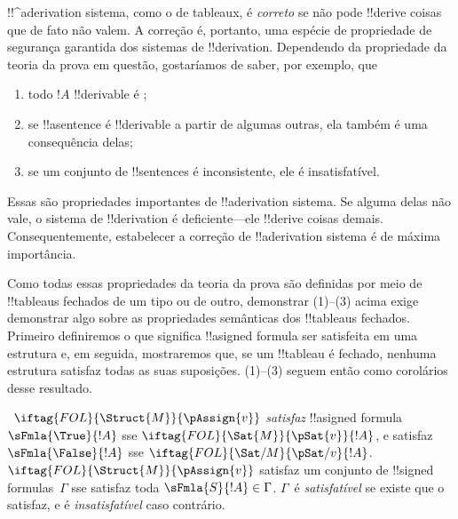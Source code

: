 \documentclass[../../../include/open-logic-section]{subfiles}
\begin{document}
      {}
      {}
      

\begin{explain}
!!^a{derivation} sistema, como o de tableaux, é \emph{correto}
se não pode !!{derive} coisas que de fato não valem. A correção é,
portanto, uma espécie de propriedade de segurança garantida dos sistemas de !!{derivation}.
Dependendo da propriedade da teoria da prova em questão, gostaríamos
de saber, por exemplo, que
\begin{enumerate}
\item todo $!A$ !!{derivable} é ;
\item se !!a{sentence} é !!{derivable} a partir de algumas outras, ela também é uma
  consequência delas;
\item se um conjunto de !!{sentence}s é inconsistente, ele é insatisfatível.
\end{enumerate}
Essas são propriedades importantes de !!a{derivation} sistema. Se alguma delas não
vale, o sistema de !!{derivation} é deficiente---ele !!{derive} coisas demais.
Consequentemente, estabelecer a correção de !!a{derivation} sistema é de
máxima importância.

Como todas essas propriedades da teoria da prova são definidas por meio de
!!{tableau}s fechados de um tipo ou de outro, demonstrar (1)--(3) acima exige
demonstrar algo sobre as propriedades semânticas dos
!!{tableau}s fechados. Primeiro definiremos o que significa !!a{signed
  formula} ser satisfeita em uma estrutura e, em seguida, mostraremos que, se um
!!{tableau} é fechado, nenhuma estrutura satisfaz todas as suas suposições.
(1)--(3) seguem então como corolários desse resultado.
\end{explain}

\begin{defn}
~$\iftag{FOL}{\Struct{M}}{\pAssign{v}}$
\emph{satisfaz} !!a{signed formula} $\sFmla{\True}{!A}$ sse
$\iftag{FOL}{\Sat{M}}{\pSat{v}}{!A}$, e satisfaz
$\sFmla{\False}{!A}$ sse
$\iftag{FOL}{\Sat/{M}}{\pSat/{v}}{!A}$. $\iftag{FOL}{\Struct{M}}{\pAssign{v}}$
satisfaz um conjunto de !!{signed formula}s~$\Gamma$ sse satisfaz toda
$\sFmla{S}{!A} \in \Gamma$. $\Gamma$~é \emph{satisfatível} se existe
 que o satisfaz, e é
\emph{insatisfatível} caso contrário.
\end{defn}
\end{document}
